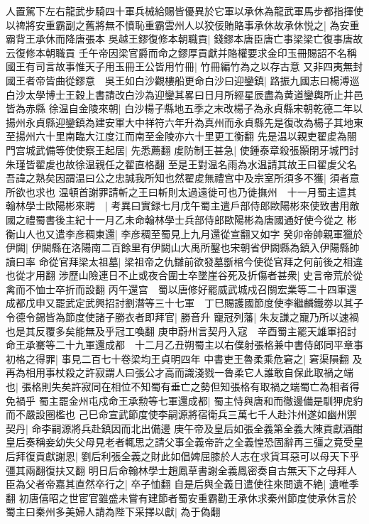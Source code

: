 人置駕下左右龍武步騎四十軍兵械給賜皆優異於它軍以承休為龍武軍馬步都指揮使以禆將安重霸副之舊將無不憤恥重霸雲州人以狡佞賄賂事承休故承休悦之|{
	為安重霸背王承休而降唐張本}
吳越王鏐復修本朝職貢|{
	錢鏐本唐臣唐亡事梁梁亡復事唐故云復修本朝職貢}
壬午帝因梁官爵而命之鏐厚貢獻并賂權要求金印玉冊賜詔不名稱國王有司言故事惟天子用玉冊王公皆用竹冊|{
	竹冊編竹為之以存古意}
又非四夷無封國王者帝皆曲從鏐意　吳王如白沙觀樓船更命白沙曰迎鑾鎮|{
	路振九國志曰楊溥巡白沙太學博士王穀上書請改白沙為迎鑾其畧曰日月所經星辰盡為黄道鑾輿所止井邑皆為赤縣}
徐温自金陵來朝|{
	白沙楊子縣地五季之末改楊子為永貞縣宋朝乾德二年以揚州永貞縣迎鑾鎮為建安軍大中祥符六年升為真州而永貞縣先是復改為楊子其地東至揚州六十里南臨大江度江而南至金陵亦六十里更工衡翻}
先是温以親吏翟䖍為閤門宫城武備等使使察王起居|{
	先悉薦翻}
䖍防制王甚急|{
	使鍾泰章殺張顥閉牙城門討朱瑾皆翟䖍也故徐温親任之翟直格翻}
至是王對温名雨為水温請其故王曰翟䖍父名吾諱之熟矣因謂温曰公之忠誠我所知也然翟䖍無禮宫中及宗室所須多不獲|{
	須者意所欲也求也}
温頓首謝罪請斬之王曰斬則太過遠徙可也乃徙撫州　十一月蜀主遣其翰林學士歐陽彬來聘　|{
	考異曰實録七月戊午蜀主遣戶部侍郎歐陽彬來使致書用敵國之禮蜀書後主紀十一月乙未命翰林學士兵部侍郎歐陽彬為唐國通好使今從之}
彬衡山人也又遣李彦稠東還|{
	李彦稠至蜀見上九月還從宣翻又如字}
癸卯帝帥親軍獵於伊闕|{
	伊闕縣在洛陽南二百餘里有伊闕山大禹所鑿也宋朝省伊闕縣為鎮入伊陽縣帥讀曰率}
命從官拜梁太祖墓|{
	梁祖帝之仇讎前欲發墓斵棺今使從官拜之何前後之相違也從才用翻}
涉歷山險連日不止或夜合圍士卒墜崖谷死及折傷者甚衆|{
	史言帝荒於從禽而不恤士卒折而設翻}
丙午還宫　蜀以唐修好罷威武城戍召關宏業等二十四軍還成都戊申又罷武定武興招討劉潛等三十七軍　丁巳賜護國節度使李繼麟鐵劵以其子令德令錫皆為節度使諸子勝衣者即拜官|{
	勝音升}
寵冠列藩|{
	朱友謙之寵乃所以速禍也是其反覆多矣能無及乎冠工喚翻}
庚申蔚州言契丹入寇　辛酉蜀主罷天雄軍招討命王承騫等二十九軍還成都　十二月乙丑朔蜀主以右僕射張格兼中書侍郎同平章事初格之得罪|{
	事見二百七十卷梁均王貞明四年}
中書吏王魯柔乘危窘之|{
	窘渠隕翻}
及再為相用事杖殺之許寂謂人曰張公才高而識淺戮一魯柔它人誰敢自保此取禍之端也|{
	張格則失矣許寂同在相位不知蜀有垂亡之勢但知張格有取禍之端蜀亡為相者得免禍乎}
蜀主罷金州屯戍命王承勲等七軍還成都|{
	蜀主恃與唐和而徹邊備是馴狎虎豹而不嚴設圈檻也}
己巳命宣武節度使李嗣源將宿衛兵三萬七千人赴汴州遂如幽州禦契丹|{
	命李嗣源將兵赴鎮因而北出備邊}
庚午帝及皇后如張全義第全義大陳貢獻酒酣皇后奏稱妾幼失父母見老者輒思之請父事全義帝許之全義惶恐固辭再三彊之竟受皇后拜復貢獻謝恩|{
	劉后利張全義之財此如倡婢屈膝於人志在求貨耳惡可以母天下乎彊其兩翻復扶又翻}
明日后命翰林學士趙鳳草書謝全義鳳密奏自古無天下之母拜人臣為父者帝嘉其直然卒行之|{
	卒子恤翻}
自是后與全義日遣使往來問遺不絶|{
	遺唯季翻}
初唐僖昭之世宦官雖盛未嘗有建節者蜀安重霸勸王承休求秦州節度使承休言於蜀主曰秦州多美婦人請為陛下采擇以獻|{
	為于偽翻}
